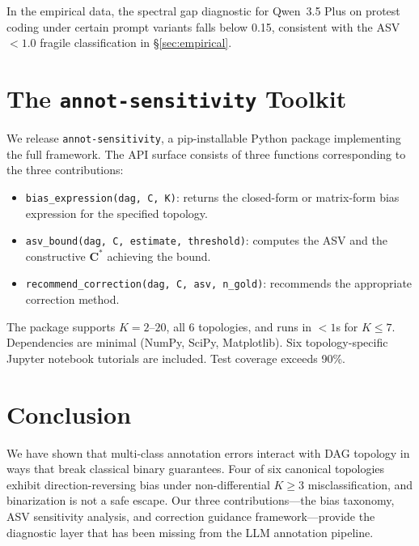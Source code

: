 \documentclass[11pt]{article}
\newcommand{\bC}{\mathbf{C}}
\begin{document}
In the empirical data, the spectral gap diagnostic for Qwen~3.5 Plus on protest coding under certain prompt variants falls below 0.15, consistent with the ASV $<\!1.0$ fragile classification in \S\ref{sec:empirical}.


\section{The \texttt{annot-sensitivity} Toolkit}
\label{sec:toolkit}

We release \texttt{annot-sensitivity}, a pip-installable Python package implementing the full framework.
The API surface consists of three functions corresponding to the three contributions:
\begin{itemize}
    \item \texttt{bias\_expression(dag, C, K)}: returns the closed-form or matrix-form bias expression for the specified topology.
    \item \texttt{asv\_bound(dag, C, estimate, threshold)}: computes the ASV and the constructive $\bC^*$ achieving the bound.
    \item \texttt{recommend\_correction(dag, C, asv, n\_gold)}: recommends the appropriate correction method.
\end{itemize}

The package supports $K = 2$--$20$, all 6 topologies, and runs in $<\!1$s for $K\!\le\!7$.
Dependencies are minimal (NumPy, SciPy, Matplotlib).
Six topology-specific Jupyter notebook tutorials are included.
Test coverage exceeds 90\%.


\section{Conclusion}
\label{sec:conclusion}

We have shown that multi-class annotation errors interact with DAG topology in ways that break classical binary guarantees.
Four of six canonical topologies exhibit direction-reversing bias under non-differential $K\!\ge\!3$ misclassification, and binarization is not a safe escape.
Our three contributions---the bias taxonomy, ASV sensitivity analysis, and correction guidance framework---provide the diagnostic layer that has been missing from the LLM annotation pipeline.
\end{document}
